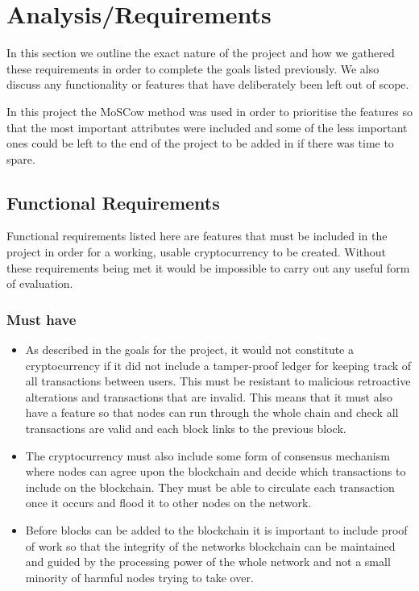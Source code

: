 \documentclass{l4proj}
\begin{document}
\chapter{Analysis/Requirements}
In this section we outline the exact nature of the project and how we gathered these requirements in order to 
complete the goals listed previously. We also discuss any functionality or features that have deliberately been
left out of scope.

In this project the MoSCow method was used in order to prioritise the features so that the most important attributes
were included and some of the less important ones could be left to the end of the project to be added in if there was
time to spare.

\section{Functional Requirements}
Functional requirements listed here are features that must be included in the project in order for a working,
usable cryptocurrency to be created. Without these requirements being met it would be impossible to carry out any
useful form of evaluation.

\subsection{Must have}
\begin{itemize}
    \item As described in the goals for the project, it would not constitute a cryptocurrency if it did not include a tamper-proof
        ledger for keeping track of all transactions between users. This must be resistant to malicious retroactive alterations
        and transactions that are invalid. This means that it must also have a feature so that nodes can run through the 
        whole chain and check all transactions are valid and each block links to the previous block.

    \item The cryptocurrency must also include some form of consensus mechanism where nodes can agree upon the blockchain
        and decide which transactions to include on the blockchain. They must be able to circulate each transaction once
        it occurs and flood it to other nodes on the network.
    
    \item Before blocks can be added to the blockchain it is important to include proof of work so that the integrity of the 
        networks blockchain can be maintained and guided by the processing power of the whole network and not a small minority
        of harmful nodes trying to take over.
\end{itemize}
\end{document}
